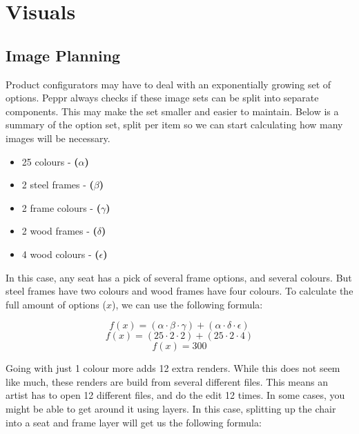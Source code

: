 \section{Visuals}

\subsection{Image Planning}
Product configurators may have to deal with an exponentially growing set of options. Peppr always checks if these image sets can be split into separate components. This may make the set smaller and easier to maintain. Below is a summary of the option set, split per item so we can start calculating how many images will be necessary.
\begin{itemize}
	\item 25 colours - \textbf{(\( \alpha \))}
	\item 2 steel frames - \textbf{(\( \beta \))}
	\item 2 frame colours - \textbf{(\( \gamma \))}
	\item 2 wood frames - \textbf{(\( \delta \))}
	\item 4 wood colours - \textbf{(\( \epsilon \))}
\end{itemize}

In this case, any seat has a pick of several frame options, and several colours. But steel frames have two colours and wood frames have four colours. To calculate the full amount of options ($x$), we can use the following formula:
 
\[ f(x) = (\alpha \cdot \beta \cdot \gamma) + (\alpha \cdot \delta \cdot \epsilon)\]
\[ f(x) = (25 \cdot 2 \cdot 2) + (25 \cdot 2 \cdot 4)\]
\[ f(x) = 300\]

Going with just 1 colour more adds 12 extra renders. While this does not seem like much, these renders are build from several different files. This means an artist has to open 12 different files, and do the edit 12 times.
In some cases, you might be able to get around it using layers. In this case, splitting up the chair into a seat and frame layer will get us the following formula:

